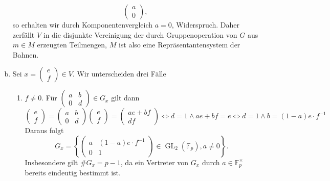 \documentclass{article}
\begin{document}
\begin{enumerate}[(a)]
\[\begin{pmatrix}
                  a \\0
              \end{pmatrix},
          \]
          so erhalten wir durch Komponentenvergleich $a = 0$, Widerspruch.
          Daher zerfällt $V$ in die disjunkte Vereinigung der durch Gruppenoperation von $G$ aus $m \in M$ erzeugten Teilmengen,
          $M$ ist also eine Repräsentantensystem der Bahnen.
    \item Sei $x = \begin{pmatrix}
                  e \\f
              \end{pmatrix} \in V$. Wir unterscheiden drei Fälle
          \begin{enumerate}[(1)]
              \item $f \neq 0$. Für $\begin{pmatrix}
                            a & b \\0&d
                        \end{pmatrix} \in G_x$ gilt dann
                    \[
                        \begin{pmatrix}
                            e \\f
                        \end{pmatrix} = \begin{pmatrix}
                            a & b \\ 0 & d
                        \end{pmatrix}\begin{pmatrix}
                            e \\f
                        \end{pmatrix} = \begin{pmatrix}
                            ae + bf \\df
                        \end{pmatrix} \Leftrightarrow d = 1 \land ae+bf = e \Leftrightarrow d = 1\land b = (1-a)e\cdot f^{-1}
                    \]
                    Daraus folgt
                    \[
                        G_x = \left\{\begin{pmatrix}
                            a & (1-a)e \cdot f^{-1} \\
                            0 & 1
                        \end{pmatrix} \in \operatorname{GL}_2(\mathbb{F}_p), a\neq 0\right\}.
                    \]
                    Insbesondere gilt $\# G_x = p-1$, da ein Vertreter von $G_x$ durch $a\in \mathbb{F}_p^\times$ bereits eindeutig bestimmt ist.

\end{enumerate}
\end{enumerate}
\end{document}
